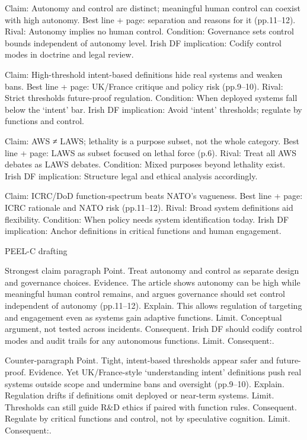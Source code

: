 Claim: Autonomy and control are distinct; meaningful human control can coexist with high autonomy.
Best line + page: separation and reasons for it (pp.11–12).
Rival: Autonomy implies no human control.
Condition: Governance sets control bounds independent of autonomy level.
Irish DF implication: Codify control modes in doctrine and legal review.

Claim: High-threshold intent-based definitions hide real systems and weaken bans.
Best line + page: UK/France critique and policy risk (pp.9–10).
Rival: Strict thresholds future-proof regulation.
Condition: When deployed systems fall below the ‘intent’ bar.
Irish DF implication: Avoid ‘intent’ thresholds; regulate by functions and control.

Claim: AWS ≠ LAWS; lethality is a purpose subset, not the whole category.
Best line + page: LAWS as subset focused on lethal force (p.6).
Rival: Treat all AWS debates as LAWS debates.
Condition: Mixed purposes beyond lethality exist.
Irish DF implication: Structure legal and ethical analysis accordingly.

Claim: ICRC/DoD function-spectrum beats NATO’s vagueness.
Best line + page: ICRC rationale and NATO risk (pp.11–12).
Rival: Broad system definitions aid flexibility.
Condition: When policy needs system identification today.
Irish DF implication: Anchor definitions in critical functions and human engagement.

PEEL-C drafting

Strongest claim paragraph
Point. Treat autonomy and control as separate design and governance choices.
Evidence. The article shows autonomy can be high while meaningful human control remains, and argues governance should set control independent of autonomy (pp.11–12).
Explain. This allows regulation of targeting and engagement even as systems gain adaptive functions.
Limit. Conceptual argument, not tested across incidents.
Consequent. Irish DF should codify control modes and audit trails for any autonomous functions. Limit. Consequent:.

Counter-paragraph
Point. Tight, intent-based thresholds appear safer and future-proof.
Evidence. Yet UK/France-style ‘understanding intent’ definitions push real systems outside scope and undermine bans and oversight (pp.9–10).
Explain. Regulation drifts if definitions omit deployed or near-term systems.
Limit. Thresholds can still guide R\&D ethics if paired with function rules.
Consequent. Regulate by critical functions and control, not by speculative cognition. Limit. Consequent:.

